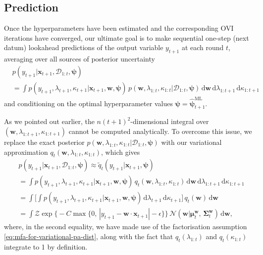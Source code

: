 

\subsection{Prediction}
\label{sec:bayespa-prediction}

Once the hyperparameters have been estimated and the corresponding OVI iterations have converged, our ultimate goal is to make sequential one-step (next datum) lookahead predictions of the output variable $y_{t+1}$ at each round $t$, averaging over all sources of posterior uncertainty
\begin{equation}
\begin{split}
	& p(y_{t+1}|\mathbf{x}_{t+1}, \mathcal{D}_{1:t}, \boldsymbol{\psi})
	\\
	&= \int p(y_{t+1}, \lambda_{t+1}, \kappa_{t+1}|\mathbf{x}_{t+1}, \mathbf{w}, \boldsymbol{\psi})\,p(\mathbf{w}, \lambda_{1:t}, \kappa_{1:t}|\mathcal{D}_{1:t}, \boldsymbol{\psi})\,\mathrm{d}\mathbf{w}\,\mathrm{d}\lambda_{1:t+1}\,\mathrm{d}\kappa_{1:t+1}
\end{split}
\end{equation}
and conditioning on the optimal hyperparameter values $\boldsymbol{\psi} = \widehat{\boldsymbol{\psi}}_{t+1}^\text{ML}$.

As we pointed out earlier, the $n(t+1)^2$-dimensional integral over $(\mathbf{w}, \lambda_{1:t+1}, \kappa_{1:t+1})$ cannot be computed analytically. To overcome this issue, we replace the exact posterior $p(\mathbf{w}, \lambda_{1:t}, \kappa_{1:t}|\mathcal{D}_{1:t}, \boldsymbol{\psi})$ with our variational approximation $q_{t}(\mathbf{w}, \lambda_{1:t}, \kappa_{1:t})$, which gives
\begin{align}
\label{eq:pa-approx-predictive-distribution}
	& p(y_{t+1}|\mathbf{x}_{t+1}, \mathcal{D}_{1:t}, \boldsymbol{\psi})
	\approx \widetilde{q}_{t}(y_{t+1}|\mathbf{x}_{t+1}, \boldsymbol{\psi})
	\nonumber \\
	&= \int p(y_{t+1}, \lambda_{t+1}, \kappa_{t+1}|\mathbf{x}_{t+1}, \mathbf{w}, \boldsymbol{\psi})\,q_{t}(\mathbf{w}, \lambda_{1:t}, \kappa_{1:t})\,\mathrm{d}\mathbf{w}\,\mathrm{d}\lambda_{1:t+1}\,\mathrm{d}\kappa_{1:t+1}
	\nonumber \\
	&= \int\Big[\int p(y_{t+1}, \lambda_{t+1}, \kappa_{t+1}|\mathbf{x}_{t+1}, \mathbf{w}, \boldsymbol{\psi})\,\mathrm{d}\lambda_{t+1}\,\mathrm{d}\kappa_{t+1}\Big]\,q_{t}(\mathbf{w})\,\mathrm{d}\mathbf{w}
	\nonumber \\
	&= \int\mathcal{Z}\exp\Big\{-C\max\big\{0,\, |y_{t+1}-\mathbf{w}\cdot\mathbf{x}_{t+1}|-\epsilon\big\}\Big\}\,\mathcal{N}(\mathbf{w}|\boldsymbol{\mu}_t^\mathbf{w},\, \boldsymbol{\Sigma}_t^\mathbf{w})\,\mathrm{d}\mathbf{w},
\end{align}
where, in the second equality, we have made use of the factorisation assumption \eqref{eq:mfa-for-variational-pa-dist}, along with the fact that $q_{t}(\lambda_{1:t})$ and $q_{t}(\kappa_{1:t})$ integrate to 1 by definition.


